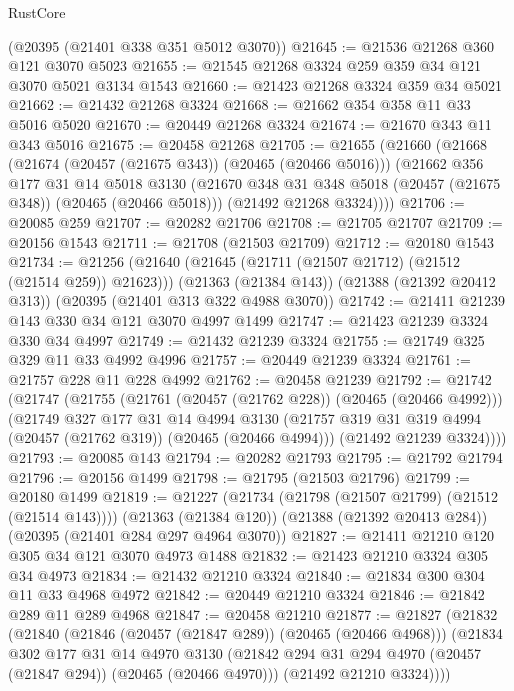 \begin{lexlean}{RustCore}
\begin{coremodule}
    (@20395 (@21401 @338 @351 @5012 @3070))
@21645 := @21536 @21268 @360 @121 @3070 @5023
@21655 := @21545 @21268 @3324 @259 @359 @34 @121 @3070 @5021 @3134 @1543
@21660 := @21423 @21268 @3324 @359 @34 @5021
@21662 := @21432 @21268 @3324
@21668 := @21662 @354 @358 @11 @33 @5016 @5020
@21670 := @20449 @21268 @3324
@21674 := @21670 @343 @11 @343 @5016
@21675 := @20458 @21268
@21705 := @21655
    (@21660
      (@21668
        (@21674 (@20457 (@21675 @343)) (@20465 (@20466 @5016)))
        (@21662
          @356
          @177
          @31
          @14
          @5018
          @3130
          (@21670 @348 @31 @348 @5018 (@20457 (@21675 @348)) (@20465 (@20466 @5018)))
          (@21492 @21268 @3324))))
@21706 := @20085 @259
@21707 := @20282 @21706
@21708 := @21705 @21707
@21709 := @20156 @1543
@21711 := @21708 (@21503 @21709)
@21712 := @20180 @1543
@21734 := @21256
    (@21640 (@21645 (@21711 (@21507 @21712) (@21512 (@21514 @259)) @21623)))
    (@21363 (@21384 @143))
    (@21388 (@21392 @20412 @313))
    (@20395 (@21401 @313 @322 @4988 @3070))
@21742 := @21411 @21239 @143 @330 @34 @121 @3070 @4997 @1499
@21747 := @21423 @21239 @3324 @330 @34 @4997
@21749 := @21432 @21239 @3324
@21755 := @21749 @325 @329 @11 @33 @4992 @4996
@21757 := @20449 @21239 @3324
@21761 := @21757 @228 @11 @228 @4992
@21762 := @20458 @21239
@21792 := @21742
    (@21747
      (@21755
        (@21761 (@20457 (@21762 @228)) (@20465 (@20466 @4992)))
        (@21749
          @327
          @177
          @31
          @14
          @4994
          @3130
          (@21757 @319 @31 @319 @4994 (@20457 (@21762 @319)) (@20465 (@20466 @4994)))
          (@21492 @21239 @3324))))
@21793 := @20085 @143
@21794 := @20282 @21793
@21795 := @21792 @21794
@21796 := @20156 @1499
@21798 := @21795 (@21503 @21796)
@21799 := @20180 @1499
@21819 := @21227
    (@21734 (@21798 (@21507 @21799) (@21512 (@21514 @143))))
    (@21363 (@21384 @120))
    (@21388 (@21392 @20413 @284))
    (@20395 (@21401 @284 @297 @4964 @3070))
@21827 := @21411 @21210 @120 @305 @34 @121 @3070 @4973 @1488
@21832 := @21423 @21210 @3324 @305 @34 @4973
@21834 := @21432 @21210 @3324
@21840 := @21834 @300 @304 @11 @33 @4968 @4972
@21842 := @20449 @21210 @3324
@21846 := @21842 @289 @11 @289 @4968
@21847 := @20458 @21210
@21877 := @21827
    (@21832
      (@21840
        (@21846 (@20457 (@21847 @289)) (@20465 (@20466 @4968)))
        (@21834
          @302
          @177
          @31
          @14
          @4970
          @3130
          (@21842 @294 @31 @294 @4970 (@20457 (@21847 @294)) (@20465 (@20466 @4970)))
          (@21492 @21210 @3324))))

\end{coremodule}
\end{lexlean}
